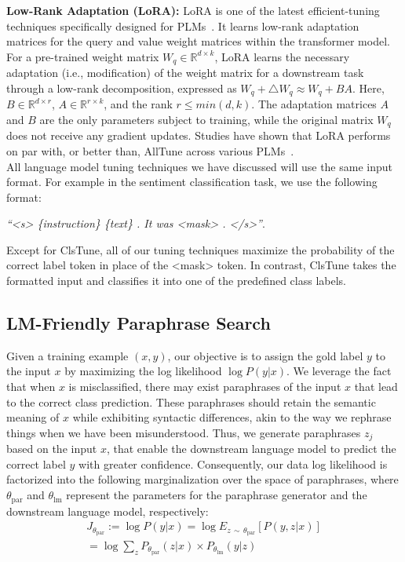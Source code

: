 \documentclass[11pt]{article}
\begin{document}
\textbf{Low-Rank Adaptation (LoRA):} LoRA is one of the latest efficient-tuning techniques specifically designed for PLMs~\cite{DBLP:journals/corr/abs-2106-09685}. It learns low-rank adaptation matrices for the query and value weight matrices within the transformer model. For a pre-trained weight matrix $W_q \in \mathbb{R}^{d \times k}$, LoRA learns the necessary adaptation (i.e., modification) of the weight matrix for a downstream task through a low-rank decomposition, expressed as $W_q + \triangle W_q \approx W_q + BA$. Here, $B \in \mathbb{R}^{d \times r}$, $A \in \mathbb{R}^{r \times k}$, and the rank $r \le min(d, k)$. The adaptation matrices $A$ and $B$ are the only parameters subject to training, while the original matrix $W_q$ does not receive any gradient updates. Studies have shown that LoRA performs on par with, or better than, AllTune across various PLMs~\cite{DBLP:journals/corr/abs-2106-09685}.
\\
All language model tuning techniques we have discussed will use the same input format. For example in the sentiment classification task, we use the following format:

{\small\textit{``<s> \{instruction\} \{text\} . It was <mask> . </s>''}.}

Except for ClsTune, all of our tuning techniques maximize the probability of the correct label token in place of the <mask> token. In contrast, ClsTune takes the formatted input and classifies it into one of the predefined class labels.

\subsection{LM-Friendly Paraphrase Search}
\label{paraphrase-objectives}
Given a training example $(x, y)$, our objective is to assign the gold label $y$ to the input $x$  by maximizing the log likelihood $\log P(y|x)$. We leverage the fact that when $x$ is misclassified, there may exist paraphrases of the input $x$ that lead to the correct class prediction. These paraphrases should retain the semantic meaning of $x$ while exhibiting syntactic differences, akin to the way we rephrase things when we have been misunderstood. Thus, we generate paraphrases $z_{j}$ based on the input $x$, that enable the downstream language model to predict the correct label $y$ with greater confidence. Consequently, our data log likelihood is factorized into the following marginalization over the space of paraphrases, where $\theta_{\text{par}}$ and $\theta_{\text{lm}}$ represent the parameters for the paraphrase generator and the downstream language model, respectively:
\begin{multline}
J_{\theta_{\text{par}}} := \log P(y | x) = \log E_{z \, \sim \, \theta_{\text{par}}} [P(y, z| x)] \\ = \log \sum_{z} P_{\theta_{\text{par}}}(z | x) \times P_{\theta_{\text{lm}}}(y | z)
\label{lmfp-main-objective}
\end{multline}
\end{document}
